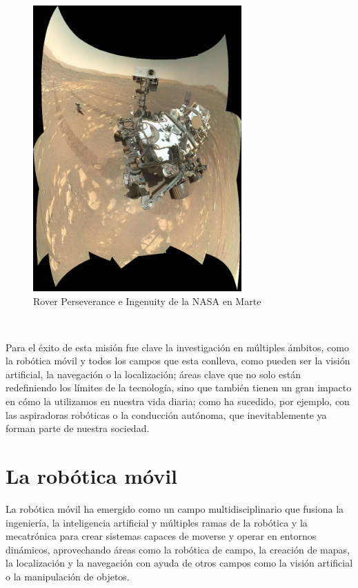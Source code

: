 \begin{figure} [h!]
  \begin{center}
    \includegraphics[width=8cm]{figs/perseverance_ingenuity_selfie_panorama}
  \end{center}
  \caption{Rover Perseverance e Ingenuity de la NASA en Marte \cite{perseverance_ingenuity}}
  \label{fig:rover}
\end{figure}\

Para el éxito de esta misión fue clave la investigación en múltiples ámbitos,
como la robótica móvil y todos los campos que esta conlleva, como pueden ser la
visión artificial, la navegación o la localización; áreas clave que no solo
están redefiniendo los límites de la tecnología, sino que también tienen un gran
impacto en cómo la utilizamos en nuestra vida diaria; como ha sucedido, por
ejemplo, con las aspiradoras robóticas o la conducción autónoma, que
inevitablemente ya forman parte de nuestra sociedad.



\section{La robótica móvil}
\label{sec:robotica_movil} %

La robótica móvil ha emergido como un campo multidisciplinario que fusiona la
ingeniería, la inteligencia artificial y múltiples ramas de la robótica y la
mecatrónica para crear sistemas capaces de moverse y operar en entornos
dinámicos, aprovechando áreas como la robótica de campo, la creación de mapas,
la localización y la navegación con ayuda de otros campos como la visión
artificial o la manipulación de objetos.
\\

